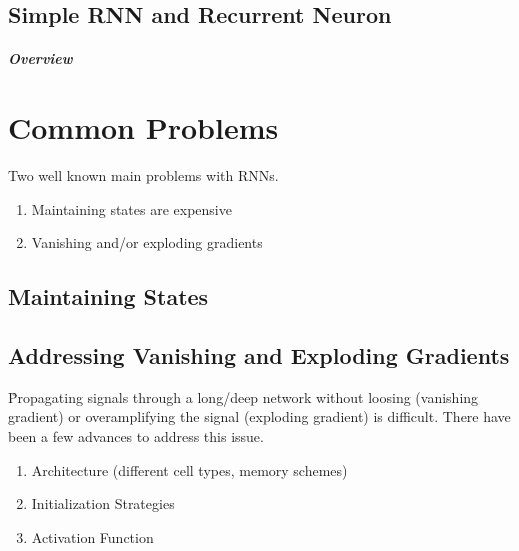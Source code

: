 
\subsection{Simple RNN and Recurrent Neuron}



\subparagraph{Overview}



\section{Common Problems}

Two well known main problems with RNNs.

\begin{enumerate}[noitemsep,topsep=0pt]
	\item Maintaining states are expensive
	\item Vanishing and/or exploding gradients
\end{enumerate}


\subsection{Maintaining States}


\subsection{Addressing Vanishing and Exploding Gradients}

\r{Propagating signals through a long/deep network without loosing (vanishing gradient) or overamplifying the signal (exploding gradient) is difficult.  There have been a few advances to address this issue.}

\begin{enumerate}[noitemsep,topsep=0pt]
	\item Architecture (different cell types, memory schemes)
	\item Initialization Strategies
	\item Activation Function
\end{enumerate}

